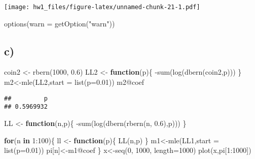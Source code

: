 \documentclass[
]{article}
\newenvironment{Shaded}{\begin{snugshade}}{\end{snugshade}}
\newcommand{\AttributeTok}[1]{\textcolor[rgb]{0.77,0.63,0.00}{#1}}
\newcommand{\ControlFlowTok}[1]{\textcolor[rgb]{0.13,0.29,0.53}{\textbf{#1}}}
\newcommand{\DecValTok}[1]{\textcolor[rgb]{0.00,0.00,0.81}{#1}}
\newcommand{\FloatTok}[1]{\textcolor[rgb]{0.00,0.00,0.81}{#1}}
\newcommand{\FunctionTok}[1]{\textcolor[rgb]{0.00,0.00,0.00}{#1}}
\newcommand{\NormalTok}[1]{#1}
\newcommand{\OtherTok}[1]{\textcolor[rgb]{0.56,0.35,0.01}{#1}}
\newcommand{\SpecialCharTok}[1]{\textcolor[rgb]{0.00,0.00,0.00}{#1}}
\newcommand{\StringTok}[1]{\textcolor[rgb]{0.31,0.60,0.02}{#1}}
\begin{document}
\texttt{[image: hw1\_files/figure-latex/unnamed-chunk-21-1.pdf]}

\begin{Shaded}
\begin{Highlighting}[]
\FunctionTok{options}\NormalTok{(}\AttributeTok{warn =} \FunctionTok{getOption}\NormalTok{(}\StringTok{"warn"}\NormalTok{))}
\end{Highlighting}
\end{Shaded}

\hypertarget{c-2}{%
\subsection{c)}\label{c-2}}

\begin{Shaded}
\begin{Highlighting}[]
\NormalTok{coin2 }\OtherTok{\textless{}{-}} \FunctionTok{rbern}\NormalTok{(}\DecValTok{1000}\NormalTok{, }\FloatTok{0.6}\NormalTok{)}
\NormalTok{LL2 }\OtherTok{\textless{}{-}} \ControlFlowTok{function}\NormalTok{(p)\{}
  \SpecialCharTok{{-}}\FunctionTok{sum}\NormalTok{(}\FunctionTok{log}\NormalTok{(}\FunctionTok{dbern}\NormalTok{(coin2,p)))}
\NormalTok{\}}
\NormalTok{m2}\OtherTok{\textless{}{-}}\FunctionTok{mle}\NormalTok{(LL2,}\AttributeTok{start =} \FunctionTok{list}\NormalTok{(}\AttributeTok{p=}\FloatTok{0.01}\NormalTok{))}
\NormalTok{m2}\SpecialCharTok{@}\NormalTok{coef}
\end{Highlighting}
\end{Shaded}

\begin{verbatim}
##         p 
## 0.5969932
\end{verbatim}

\begin{Shaded}
\begin{Highlighting}[]
\NormalTok{LL }\OtherTok{\textless{}{-}} \ControlFlowTok{function}\NormalTok{(n,p)\{}
  \SpecialCharTok{{-}}\FunctionTok{sum}\NormalTok{(}\FunctionTok{log}\NormalTok{(}\FunctionTok{dbern}\NormalTok{(}\FunctionTok{rbern}\NormalTok{(n, }\FloatTok{0.6}\NormalTok{),p)))}
\NormalTok{\}}

\ControlFlowTok{for}\NormalTok{(n }\ControlFlowTok{in} \DecValTok{1}\SpecialCharTok{:}\DecValTok{100}\NormalTok{)\{}
\NormalTok{  ll }\OtherTok{\textless{}{-}} \ControlFlowTok{function}\NormalTok{(p)\{}
    \FunctionTok{LL}\NormalTok{(n,p)}
\NormalTok{  \}}
\NormalTok{  m1}\OtherTok{\textless{}{-}}\FunctionTok{mle}\NormalTok{(LL1,}\AttributeTok{start =} \FunctionTok{list}\NormalTok{(}\AttributeTok{p=}\FloatTok{0.01}\NormalTok{))}
\NormalTok{  pi[n]}\OtherTok{\textless{}{-}}\NormalTok{m1}\SpecialCharTok{@}\NormalTok{coef}
\NormalTok{\}}
\NormalTok{x}\OtherTok{\textless{}{-}}\FunctionTok{seq}\NormalTok{(}\DecValTok{0}\NormalTok{, }\DecValTok{1000}\NormalTok{, }\AttributeTok{length=}\DecValTok{1000}\NormalTok{)}
\FunctionTok{plot}\NormalTok{(x,pi[}\DecValTok{1}\SpecialCharTok{:}\DecValTok{1000}\NormalTok{])}
\end{Highlighting}
\end{Shaded}
\end{document}
